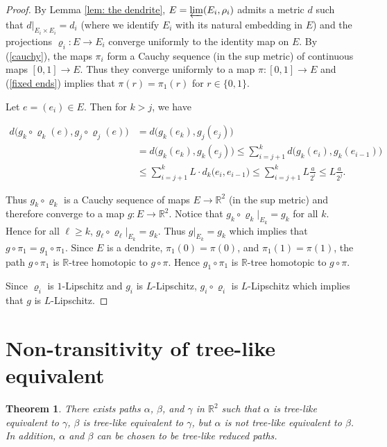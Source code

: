 \documentclass[11pt, leqno]{amsart}
\newtheorem{theorem}{Theorem}[section]
\theoremstyle{definition}\newtheorem{definition}[theorem]{Definition}
\begin{document}
\begin{proof}
    By Lemma \ref{lem: the dendrite}, $E = \varprojlim(E_i, \rho_i)$ admits a metric $d$ such that  $d|_{E_i\times E_i}= d_i$ (where we identify $E_i$ with its natural embedding in $E$) and the projections $\varrho_i: E\to E_i$ converge uniformly to the identity map on $E$. By (\ref{cauchy}), the maps $\pi_i$ form a Cauchy sequence (in the sup metric) of continuous maps $[0,1]\to E$.  Thus they converge uniformly to a map $\pi:[0,1]\to E$ and (\ref{fixed ends}) implies that $\pi(r)= \pi_1(r)$ for $r\in \{0,1\}$.

    Let $e= (e_i)\in E$.  Then for $k>j$, we have

    \begin{align*}
        d\big(g_k\circ\varrho_k(e), g_j\circ\varrho_j(e)\big) &=d\big(g_k(e_k), g_j(e_j)\big)\\
                    &=d\big(g_k(e_k), g_k(e_j)\big)\leq  \sum\limits_{i=j+1}^{k}d\big(g_k(e_i), g_k(e_{i-1})\big)\\
                    &\leq\sum\limits_{i=j+1}^{k}L\cdot d_k\big(e_i, e_{i-1})\leq\sum\limits_{i=j+1}^{k}L\frac{a}{2^i} \leq L\frac{a}{2^j}.
    \end{align*}


    Thus $g_k\circ\varrho_k$ is a Cauchy sequence of maps $E\to \mathbb{R}^2$ (in the sup metric) and therefore converge to a map $g: E\to \mathbb{R}^2$.  Notice that $g_k\circ\varrho_k|_{E_k} = g_k$ for all $k$.  Hence for all $\ell\geq k$, $g_\ell\circ\varrho_\ell|_{E_k} = g_k$.  Thus $g|_{E_k} = g_k$ which implies that $g\circ \pi_1 = g_1\circ \pi_1$.  Since $E$ is a dendrite, $\pi_1(0)= \pi(0)$, and $\pi_1(1) = \pi(1)$, the path $g\circ \pi_1$ is $\mathbb R$-tree homotopic to $g\circ \pi$. Hence $g_1\circ \pi_1$ is $\mathbb R$-tree homotopic to $g\circ \pi$.


    Since $\varrho_i$ is $1$-Lipschitz and $g_i$ is $L$-Lipschitz, $g_i\circ \varrho_i$ is $L$-Lipschitz which implies that $g$ is $L$-Lipschitz.

\end{proof}


\section{Non-transitivity of tree-like equivalent}\label{sec: the bow on top}

\begin{theorem}\label{finalthm}
    There exists paths $\alpha$, $\beta$, and $\gamma$ in $\mathbb{R}^2$ such that $\alpha$ is tree-like equivalent to $\gamma$, $\beta$ is tree-like equivalent to $\gamma$, but $\alpha$ is not tree-like equivalent to $\beta$.  In addition, $\alpha$ and $\beta$ can be chosen to be tree-like reduced paths.
\end{theorem}
\end{document}
